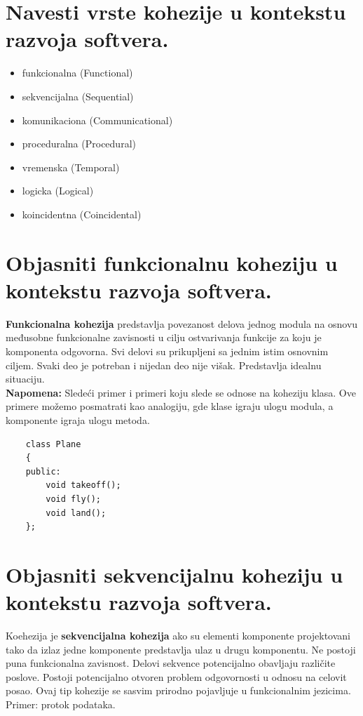 \documentclass[a4paper]{article}
\begin{document}
\section{Navesti vrste kohezije u kontekstu razvoja softvera.}
  \begin{itemize}
    \item funkcionalna (Functional)
    \item sekvencijalna (Sequential)
    \item komunikaciona (Communicational)
    \item proceduralna (Procedural)
    \item vremenska (Temporal)
    \item logicka (Logical)
    \item koincidentna (Coincidental)
  \end{itemize}
 
\section{Objasniti funkcionalnu koheziju u kontekstu razvoja softvera.}
  \textbf{Funkcionalna kohezija} predstavlja povezanost delova jednog modula na osnovu 
  međusobne funkcionalne zavisnosti u cilju ostvarivanja funkcije za koju je komponenta
  odgovorna. Svi delovi su prikupljeni sa jednim istim osnovnim ciljem. Svaki deo je potreban i
  nijedan deo nije višak. Predstavlja idealnu situaciju. \\
  \textbf{Napomena:} Sledeći primer i primeri koju slede se odnose na koheziju klasa. Ove primere
  možemo posmatrati kao analogiju, gde klase igraju ulogu modula, a komponente igraja ulogu
  metoda.

  \begin{lstlisting}
    class Plane
    {
    public:
        void takeoff();
        void fly();
        void land();
    };\end{lstlisting}

\section{Objasniti sekvencijalnu koheziju u kontekstu razvoja softvera.}
  Koehezija je \textbf{sekvencijalna kohezija} ako su elementi komponente projektovani 
  tako da izlaz jedne komponente predstavlja ulaz u drugu komponentu. Ne postoji puna
  funkcionalna zavisnost. Delovi sekvence potencijalno obavljaju različite poslove. Postoji
  potencijalno otvoren problem odgovornosti u odnosu na celovit posao. Ovaj tip kohezije
  se sasvim prirodno pojavljuje u funkcionalnim jezicima. Primer: protok podataka.
  
\end{document}
